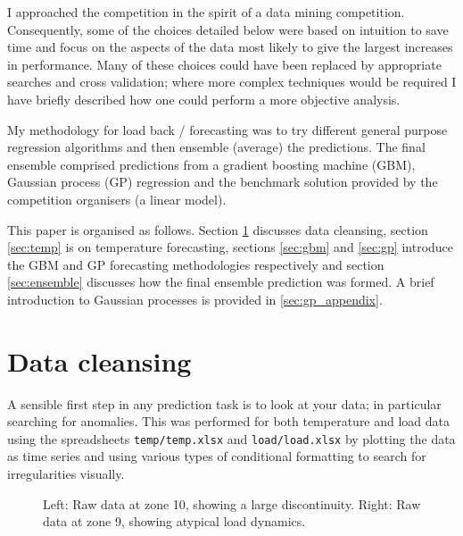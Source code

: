 \documentclass[preprint,authoryear,12pt]{elsarticle}
\begin{document}

I approached the competition in the spirit of a data mining competition.
Consequently, some of the choices detailed below were based on intuition to save time and focus on the aspects of the data most likely to give the largest increases in performance.
Many of these choices could have been replaced by appropriate searches and cross validation; where more complex techniques would be required I have briefly described how one could perform a more objective analysis.

My methodology for load back / forecasting was to try different general purpose regression algorithms and then ensemble (average) the predictions.
The final ensemble comprised predictions from a gradient boosting machine (GBM), Gaussian process (GP) regression and the benchmark solution provided by the competition organisers (a linear model).

This paper is organised as follows.
Section \ref{sec:cleans} discusses data cleansing, section \ref{sec:temp} is on temperature forecasting, sections \ref{sec:gbm} and \ref{sec:gp} introduce the GBM and GP forecasting methodologies respectively and section \ref{sec:ensemble} discusses how the final ensemble prediction was formed.
A brief introduction to Gaussian processes is provided in \ref{sec:gp_appendix}.

\section{Data cleansing}

\label{sec:cleans}

A sensible first step in any prediction task is to look at your data; in particular searching for anomalies.
This was performed for both temperature and load data using the spreadsheets \texttt{temp/temp.xlsx} and \texttt{load/load.xlsx} by plotting the data as time series and using various types of conditional formatting to search for irregularities visually.

\begin{figure}[ht]
  \begin{center}
    
  \end{center}
  \caption{Left: Raw data at zone 10, showing a large discontinuity. Right: Raw data at zone 9, showing atypical load dynamics.}
  \label{fig:load}
\end{figure}
\end{document}
